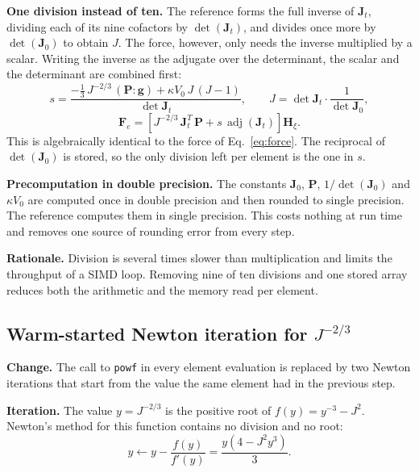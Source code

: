 \documentclass[11pt,a4paper]{article}
\newcommand{\code}[1]{\texttt{#1}}
\newcommand{\Jm}{J^{-2/3}}
\newcommand{\mat}[1]{\mathbf{#1}}
\begin{document}
\textbf{One division instead of ten.} The reference forms the full inverse of $\mat{J}_t$, dividing each of its nine cofactors by $\det(\mat{J}_t)$, and divides once more by $\det(\mat{J}_0)$ to obtain $J$. The force, however, only needs the inverse multiplied by a scalar. Writing the inverse as the adjugate over the determinant, the scalar and the determinant are combined first:
\begin{equation}
\label{eq:s}
s = \frac{ -\tfrac{1}{3}\,\Jm\,(\mat{P} : \mat{g}) + \kappa V_0\,J\,(J-1) }{ \det \mat{J}_t }, \qquad J = \det \mat{J}_t \cdot \frac{1}{\det \mat{J}_0},
\end{equation}
\begin{equation}
\label{eq:fastforce}
\mat{F}_e = \left[ \Jm\,\mat{J}_t^{T}\,\mat{P} + s\,\operatorname{adj}(\mat{J}_t) \right] \mat{H}_{\xi}.
\end{equation}
This is algebraically identical to the force of Eq.~\eqref{eq:force}. The reciprocal of $\det(\mat{J}_0)$ is stored, so the only division left per element is the one in $s$.

\textbf{Precomputation in double precision.} The constants $\mat{J}_0$, $\mat{P}$, $1/\det(\mat{J}_0)$ and $\kappa V_0$ are computed once in double precision and then rounded to single precision. The reference computes them in single precision. This costs nothing at run time and removes one source of rounding error from every step.

\textbf{Rationale.} Division is several times slower than multiplication and limits the throughput of a SIMD loop. Removing nine of ten divisions and one stored array reduces both the arithmetic and the memory read per element.

\subsection{Warm-started Newton iteration for \texorpdfstring{$\Jm$}{J\textasciicircum(-2/3)}}
\label{sec:newton}

\textbf{Change.} The call to \code{powf} in every element evaluation is replaced by two Newton iterations that start from the value the same element had in the previous step.

\textbf{Iteration.} The value $y = \Jm$ is the positive root of $f(y) = y^{-3} - J^2$. Newton's method for this function contains no division and no root:
\begin{equation}
\label{eq:newton}
y \leftarrow y - \frac{f(y)}{f'(y)} = \frac{y\left( 4 - J^2 y^3 \right)}{3}.
\end{equation}
\end{document}
